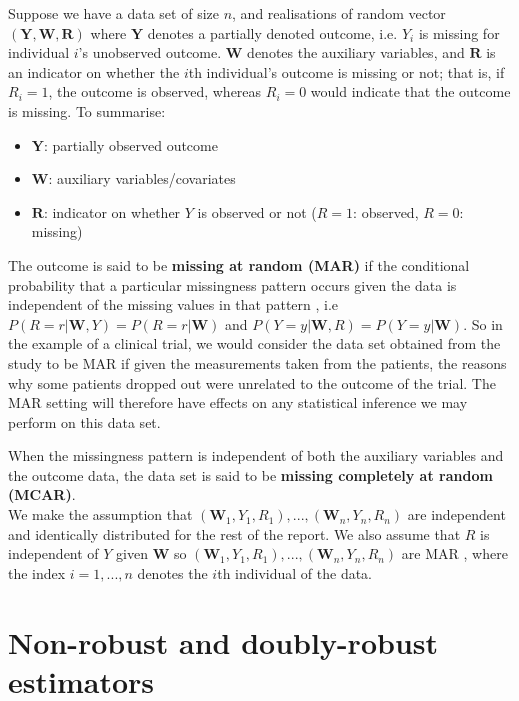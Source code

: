 \documentclass[12pt,twoside]{article}
\begin{document}
Suppose we have a data set of size $n$, and realisations of random vector $(\mathbf{Y}, \mathbf{W}, \mathbf{R})$ where $\mathbf{Y}$ denotes a partially denoted outcome, i.e. $Y_i$ is missing for individual $i$'s unobserved outcome. $\mathbf{W}$ denotes the auxiliary variables, and $\mathbf{R}$ is an indicator on whether the $i$th individual's outcome is missing or not; that is, if $R_i = 1$, the outcome is observed, whereas $R_i = 0$ would indicate that the outcome is missing.
To summarise:
\begin{itemize}
    \item $\mathbf{Y}$: partially observed outcome 
    \item $\mathbf{W}$: auxiliary variables/covariates 
    \item $\mathbf{R}$: indicator on whether $Y$ is observed or not ($R = 1$: observed, $R = 0$: missing) 
\end{itemize}

The outcome is said to be \textbf{missing at random (MAR)} if the conditional probability that a particular missingness pattern occurs given the data is independent of the missing values in that pattern \citep{vansteelandt}, i.e $P(R=r|\mathbf{W}, Y) = P(R= r|\mathbf{W})$ and  $P(Y=y|\mathbf{W}, R) = P(Y=y|\mathbf{W})$. So in the example of a clinical trial, we would consider the data set obtained from the study to be MAR if given the measurements taken from the patients, the reasons why some patients dropped out were unrelated to the outcome of the trial. The MAR setting will therefore have effects on any statistical inference we may perform on this data set.

When the missingness pattern is independent of both the auxiliary variables and the outcome data, the data set is said to be \textbf{missing completely at random (MCAR)}.\\

We make the assumption that $(\mathbf{W}_1, Y_1, R_1),...,(\mathbf{W}_n, Y_n, R_n)$ are independent and identically distributed for the rest of the report. We also assume that $R$ is independent of $Y$ given $\mathbf{W}$ so $(\mathbf{W}_1, Y_1, R_1), ... ,(\mathbf{W}_n, Y_n, R_n)$ are MAR \citep{vansteelandt}, where the index $i = 1,...,n$ denotes the $i$th individual of the data.\\

\clearpage
\section{Non-robust and doubly-robust estimators}
\end{document}
